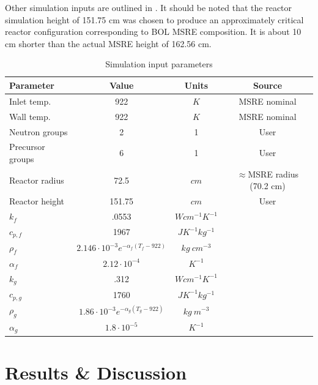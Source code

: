 \documentclass{article}
\let\Oldsection\section
\renewcommand{\section}{\FloatBarrier\Oldsection}
\begin{document}
Other simulation inputs are outlined in . It should be noted
that the reactor simulation height of 151.75 cm was chosen to produce an
approximately critical reactor configuration corresponding to \gls{BOL}
\gls{MSRE} composition. It is about 10 cm shorter than the actual \gls{MSRE}
height of 162.56 cm.

\begin{table}[htpb]
  \begin{center}
    \begin{tabular}{l|c|c|c}
      Parameter & Value & Units & Source\\\hline\hline
      Inlet temp. & 922 & $K$ & \gls{MSRE} nominal \cite{robertson_msre_1965}\\
      Wall temp. & 922 & $K$ & \gls{MSRE} nominal \cite{robertson_msre_1965}\\
      Neutron groups & 2 & 1 & User\\
      Precursor groups & 6 & 1 & User\\
      Reactor radius & 72.5 & $cm$ & $\approx$\gls{MSRE} radius (70.2 cm) \cite{robertson_msre_1965}\\
      Reactor height & 151.75 & $cm$ & User\\
      $k{_f}$ & .0553 & $W cm^{-1} K^{-1}$ & \cite{robertson_msre_1965}\\
      $c_{p,f}$ & 1967 & $J K^{-1} kg^{-1}$ & \cite{robertson_msre_1965}\\
      $\rho_f$ & $2.146\cdot 10^{-3} e^{-\alpha_f (T_f - 922)}$ & $kg\ cm^{-3}$ & \cite{robertson_msre_1965}\\
      $\alpha_f$ & $2.12\cdot 10^{-4}$ & $K^{-1}$ &
      \cite{haubenreich_experience_1970}\\
      $k_g$ & .312 & $W cm^{-1} K^{-1}$ & \cite{cammi_multi-physics_2011}\\
      $c_{p,g}$ & 1760 & $J K^{-1} kg^{-1}$ & \cite{cammi_multi-physics_2011}\\
      $\rho_g$ & $1.86\cdot 10^{-3} e^{-\alpha_g (T_g - 922)}$ & $kg\ m^{-3}$ &
      \cite{robertson_msre_1965}\\
      $\alpha_g$ & $1.8\cdot 10^{-5}$ & $K^{-1}$ &
      \cite{haubenreich_experience_1970}\\
    \end{tabular}
  \end{center}
  \caption{Simulation input parameters}
  \label{table:params}
\end{table}


\section{Results \& Discussion}
\end{document}
